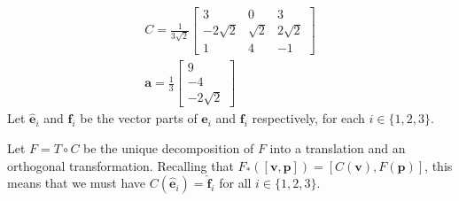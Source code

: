 \documentclass[12 pt, letterpaper]{hmcpset}
\begin{document}
\begin{solution}
	\[
		\boxed{
			\begin{gathered}
				C = \frac{1}{3 \sqrt 2} \begin{bmatrix}
				  3 & 0 & 3 \\
				  -2 \sqrt 2 & \sqrt 2 & 2 \sqrt 2 \\
				  1 & 4 & -1
			  \end{bmatrix} \\
				\mathbf{a} = \frac{1}{3} \begin{bmatrix}
				   	9 \\
					- 4 \\
					-2 \sqrt 2
				   \end{bmatrix}
			\end{gathered}
		}
	\]
	Let $\hat{\mathbf{e}}_{i}$ and $\hat{\mathbf{f}}_{i}$ be the vector parts of $\mathbf{e}_{i}$ and $\mathbf{f}_{i}$ respectively, for each $i \in \{ 1, 2, 3 \}$. 

	Let $F = T \circ C$ be the unique decomposition of $F$ into a translation and an orthogonal transformation. Recalling that $F_{*}([\mathbf{v}, \mathbf{p}]) = [C(\mathbf{v}), F(\mathbf{p})]$, this means that we must have $C(\hat{\mathbf{e}}_{i}) = \hat{\mathbf{f}}_{i}$ for all $i \in \{ 1, 2, 3 \}$. 


\end{solution}
\end{document}
